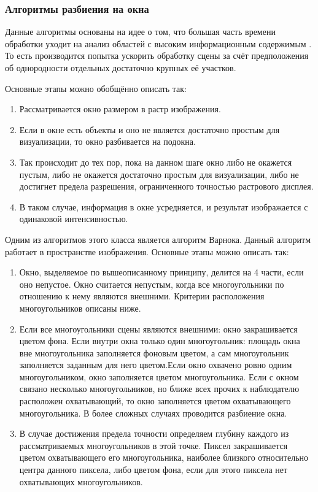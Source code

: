 \subsubsection{Алгоритмы разбиения на окна}
Данные алгоритмы основаны на идее о том, что большая часть времени обработки уходит на анализ областей с высоким информационным содержимым \cite{item12}. То есть производится попытка ускорить обработку сцены за счёт предположения об однородности отдельных достаточно крупных её участков.

Основные этапы можно обобщённо описать так:
\begin{enumerate}[label={\arabic*)}]
	\item Рассматривается окно размером в растр изображения.
	\item Если в окне есть объекты и оно не является достаточно простым для визуализации, то окно разбивается на подокна.
	\item Так происходит до тех пор, пока на данном шаге окно либо не окажется пустым, либо не окажется достаточно простым для визуализации, либо не достигнет предела разрешения, ограниченного точностью растрового дисплея.
	\item В таком случае, информация в окне усредняется, и результат изображается с одинаковой интенсивностью.
\end{enumerate}

Одним из алгоритмов этого класса является алгоритм Варнока. Данный алгоритм работает в пространстве изображения. Основные этапы можно описать так:
\begin{enumerate}[label={\arabic*)}]
	\item Окно, выделяемое по вышеописанному принципу, делится на 4 части, если оно непустое. Окно считается непустым, когда все многоугольники по отношению к нему являются внешними. Критерии расположения многоугольников описаны ниже.
	\item Если все многоугольники сцены являются внешними: окно закрашивается цветом фона. Если внутри окна только один многоугольник: площадь окна вне многоугольника заполняется фоновым цветом, а сам многоугольник заполняется заданным для него цветом.Если окно охвачено ровно одним многоугольником, окно заполняется цветом многоугольника. Если с окном связано несколько многоугольников, но ближе всех прочих к наблюдателю расположен охватывающий, то окно заполняется цветом охватывающего многоугольника. В более сложных случаях проводится разбиение окна.
	\item В случае достижения предела точности определяем глубину каждого из рассматриваемых многоугольников в этой точке. Пиксел закрашивается цветом охватывающего его многоугольника, наиболее близкого относительно центра данного пиксела, либо цветом фона, если для этого пиксела нет охватывающих многоугольников.
\end{enumerate}


